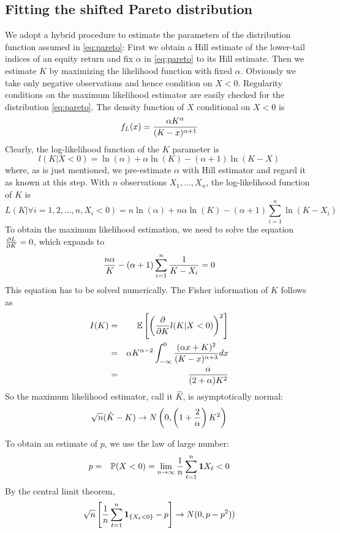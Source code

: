 \documentclass[11pt,a4]{amsart}
\newcommand{\pd}{\partial}
\newcommand{\E }{{\mathbb E}}
\renewcommand{\P }{{\mathbb P}}
\newcommand{\1}{{\mathbf 1}}
\begin{document}
\subsection{Fitting the shifted Pareto distribution}
\label{sec:hybrid_estimation}
We adopt a hybrid procedure to estimate the parameters of the
distribution function assumed in \eqref{eq:pareto}: First we
obtain a Hill estimate of the lower-tail indices of an
equity return and fix $\alpha$ in \eqref{eq:pareto}
to its Hill estimate. Then we estimate $K$ by maximizing
the likelihood function with fixed $\alpha$. Obviously we take only
negative observations and hence condition on $X < 0$. Regularity
conditions on the maximum likelihood estimator are easily checked for
the distribution \eqref{eq:pareto}.
The density function of $X$ conditional on $X < 0$ is
\[
f_L(x) = {\alpha K^{\alpha} \over (K - x)^{\alpha + 1}}
\]
Clearly, the log-likelihood function of the $K$ parameter is
\[
l(K | X < 0) = \ln(\alpha) + \alpha \ln(K) - (\alpha + 1)\ln(K - X)
\]
where, as is just mentioned, we pre-estimate $\alpha$ with Hill
estimator and regard it as known at this step. With $n$ observations
$X_1, \dots, X_n$, the log-likelihood function of $K$ is
\[
L(K | \forall i=1,2,...,n, X_i < 0) = n \ln(\alpha) + n \alpha \ln(K)
- (\alpha + 1) \sum_{i=1}^n \ln(K - X_i)
\]
To obtain the maximum likelihood estimation, we need to solve the
equation ${\pd L \over \pd K} = 0$, which expands to
\[
{n \alpha \over K} - (\alpha + 1) \sum_{i=1}^n {1 \over K - X_i} = 0
\]
This equation has to be solved numerically.
The Fisher information of $K$ follows as
\begin{eqnarray*}
  I(K) &=& \E\left[ \left( {\partial \over \partial K} l(K | X < 0) \right)^2 \right] \\
  &=& \alpha K^{\alpha - 2}
  \int_{-\infty}^0 {(\alpha x + K)^2 \over (K - x)^{\alpha + 3}} dx \\
  &=& {\alpha \over (2 + \alpha) K^2}
\end{eqnarray*}
So the maximum likelihood estimator, call it $\hat K$, is
asymptotically normal:
\[
\sqrt n (\hat K - K) \to N \left(
  0, \left( 1 + {2 \over \alpha} \right) K^2
\right)
\]

To obtain an estimate of $p$, we use the law of large number:
\begin{eqnarray*}
  p &=& \P(X < 0) = \lim_{n \to \infty}
  {1 \over n} \sum_{t=1}^n \1{X_t < 0}
\end{eqnarray*}
By the central limit theorem,
\begin{eqnarray*}
  \sqrt n \left[
    {1 \over n}\sum_{t=1}^n \1_{\{X_t < 0\}} - p
  \right] \to N(0, p - p^2))
\end{eqnarray*}
\end{document}
